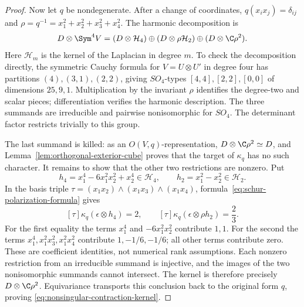 \begin{proof}
Now let \(q\) be nondegenerate.  After a change of coordinates,
\(q(x_ix_j)=\delta_{ij}\) and
\(\rho=q^{-1}=x_1^2+x_2^2+x_3^2+x_4^2\).
The harmonic decomposition is
\begin{equation}\label{eq:orthogonal-quartic-decomposition}
 D\otimes\Sym^4V=
 (D\otimes\mathcal H_4)\oplus
 (D\otimes\rho\mathcal H_2)\oplus(D\otimes\C\rho^2).
\end{equation}
Here \(\mathcal H_m\) is the kernel of the Laplacian in degree
\(m\).  To check the decomposition directly, the symmetric Cauchy
formula for \(V=U\otimes U'\) in degree four has partitions
\((4),(3,1),(2,2)\), giving \(SO_4\)-types
\([4,4],[2,2],[0,0]\) of dimensions \(25,9,1\).
Multiplication by the invariant \(\rho\) identifies the degree-two
and scalar pieces; differentiation verifies the harmonic description.
The three summands are irreducible and pairwise nonisomorphic for
\(SO_4\).  The determinant factor restricts trivially to this group.

The last summand is killed: as an \(O(V,q)\)-representation,
\(D\otimes\C\rho^2\simeq D\), and
Lemma~\ref{lem:orthogonal-exterior-cube} proves that the target of
\(\kappa_q\) has no such character.  It remains to show that the
other two restrictions are nonzero.  Put
\[
 h_4=x_1^4-6x_1^2x_2^2+x_2^4\in\mathcal H_4,
            \qquad h_2=x_1^2-x_2^2\in\mathcal H_2.
\]
In the basis triple
\(\tau=(x_1x_2)\wedge(x_1x_3)\wedge(x_1x_4)\),
formula~\eqref{eq:schur-polarization-formula} gives
\[
 [\tau]\kappa_q(\epsilon\otimes h_4)=2,
     \qquad [\tau]\kappa_q(\epsilon\otimes\rho h_2)=\frac23.
\]
For the first equality the terms \(x_1^4\) and
\(-6x_1^2x_2^2\) contribute \(1,1\).  For the second the
terms \(x_1^4,x_1^2x_3^2,x_1^2x_4^2\) contribute
\(1,-1/6,-1/6\); all other terms contribute zero.
These are coefficient identities, not numerical rank assumptions.
Each nonzero restriction from an irreducible summand is injective,
and the images of the two nonisomorphic summands cannot intersect.
The kernel is therefore precisely \(D\otimes\C\rho^2\).
Equivariance transports this conclusion back to the original form
\(q\), proving \eqref{eq:nonsingular-contraction-kernel}.
\end{proof}
